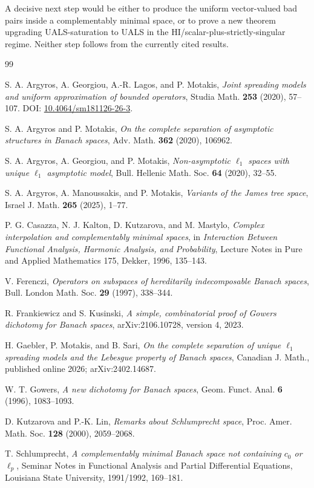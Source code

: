 \documentclass[11pt]{article}
\theoremstyle{definition}
\theoremstyle{remark}
\begin{document}
A decisive next step would be either to produce the uniform vector-valued bad pairs inside a complementably minimal space, or to prove a new theorem upgrading UALS-saturation to UALS in the HI/scalar-plus-strictly-singular regime.  Neither step follows from the currently cited results.

\begin{thebibliography}{99}

S. A. Argyros, A. Georgiou, A.-R. Lagos, and P. Motakis,
\emph{Joint spreading models and uniform approximation of bounded operators},
Studia Math. \textbf{253} (2020), 57--107.
DOI: \href{https://doi.org/10.4064/sm181126-26-3}{10.4064/sm181126-26-3}.

S. A. Argyros and P. Motakis,
\emph{On the complete separation of asymptotic structures in Banach spaces},
Adv. Math. \textbf{362} (2020), 106962.

S. A. Argyros, A. Georgiou, and P. Motakis,
\emph{Non-asymptotic $\ell_1$ spaces with unique $\ell_1$ asymptotic model},
Bull. Hellenic Math. Soc. \textbf{64} (2020), 32--55.

S. A. Argyros, A. Manoussakis, and P. Motakis,
\emph{Variants of the James tree space},
Israel J. Math. \textbf{265} (2025), 1--77.

P. G. Casazza, N. J. Kalton, D. Kutzarova, and M. Mastylo,
\emph{Complex interpolation and complementably minimal spaces},
in \emph{Interaction Between Functional Analysis, Harmonic Analysis, and Probability},
Lecture Notes in Pure and Applied Mathematics 175, Dekker, 1996, 135--143.

V. Ferenczi,
\emph{Operators on subspaces of hereditarily indecomposable Banach spaces},
Bull. London Math. Soc. \textbf{29} (1997), 338--344.

R. Frankiewicz and S. Kusinski,
\emph{A simple, combinatorial proof of Gowers dichotomy for Banach spaces},
arXiv:2106.10728, version 4, 2023.

H. Gaebler, P. Motakis, and B. Sari,
\emph{On the complete separation of unique $\ell_1$ spreading models and the Lebesgue property of Banach spaces},
Canadian J. Math., published online 2026; arXiv:2402.14687.

W. T. Gowers,
\emph{A new dichotomy for Banach spaces},
Geom. Funct. Anal. \textbf{6} (1996), 1083--1093.

D. Kutzarova and P.-K. Lin,
\emph{Remarks about Schlumprecht space},
Proc. Amer. Math. Soc. \textbf{128} (2000), 2059--2068.

T. Schlumprecht,
\emph{A complementably minimal Banach space not containing $c_0$ or $\ell_p$},
Seminar Notes in Functional Analysis and Partial Differential Equations,
Louisiana State University, 1991/1992, 169--181.

\end{thebibliography}
\end{document}
